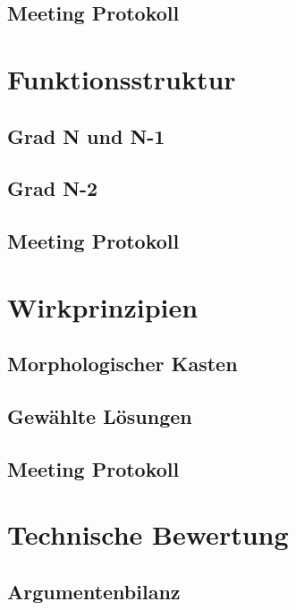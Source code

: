 \documentclass[10pt,a4paper]{article}
\begin{document}
\subsection{Meeting Protokoll}
\section{Funktionsstruktur}
\subsection{Grad N und N-1}
\subsection{Grad N-2}
\subsection{Meeting Protokoll}
\section{Wirkprinzipien}
\subsection{Morphologischer Kasten}
\subsection{Gewählte Lösungen}
\subsection{Meeting Protokoll}
\section{Technische Bewertung}
\subsection{Argumentenbilanz}
\end{document}
